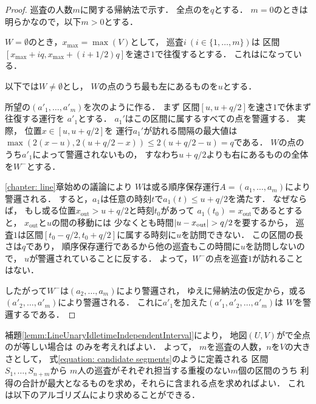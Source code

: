 \begin{proof}
  \newcommand{\leftmostpoint}{u}  %
  \newcommand{\leftmostpatroller}{巡査1}

  巡査の人数$m$に関する帰納法で示す．
  全点の{\maxIdletime}を$q$とする．
  $m = 0$のときは明らかなので，以下$m > 0$とする．

  $W = \emptyset$のとき，$x_{\max} = \max(V)$として，
  巡査$i\ (i \in \{ 1, \ldots, m \})$は
  区間$[x_{\max} + iq, x_{\max} + (i + 1/2)q]$を速さ$1$で往復するとする．
  これは{\sepSectPatroll}になっている．

  以下では$W \neq \emptyset$とし，
  $W$の点のうち最も左にあるものを$\leftmostpoint$とする．

  所望の{\sepSectPatroll}$(a' _1, \dots, a' _m)$を次のように作る．
  まず
  区間$[\leftmostpoint, \leftmostpoint + q/2]$を速さ$1$で休まず往復する運行を
  $a' _1$とする．
  $a_1'$はこの区間に属するすべての点を警邏する．
  実際，
  位置$x \in [u, u + q/2]$を
  運行$a_1'$が訪れる間隔の最大値は
  $ \max( 2(x - \leftmostpoint), 2(\leftmostpoint + q/2 - x) )
    \leq 2(\leftmostpoint + q/2 - \leftmostpoint) = q$である．
  $W$の点のうち$a' _1$によって警邏されないもの，
  すなわち$u + q / 2$よりも右にあるものの全体を$W^-$とする．

  \ref{chapter: line}章始めの議論により
  $W$は或る順序保存運行$A = (a_1, \ldots, a_m)$により警邏される．
  すると，$a_1$は任意の時刻$t$で$a_1(t) \leq u + q/2$を満たす．
  \newcommand{\vout}{x_{\mathrm{out}}}
  なぜならば，
  もし或る位置$\vout > u + q/2$と時刻$t_0$があって
  $a_1(t_0) = \vout$であるとすると，
  $\vout$と$u$の間の移動には
  少なくとも時間$\abs{u - \vout} > q / 2$を要するから，
  巡査$1$は区間$[t_0 - q / 2, t_0 + q / 2]$に属する時刻に$u$を訪問できない．
  この区間の長さは$q$であり，
  順序保存運行であるから他の巡査もこの時間に$u$を訪問しないので，
  $u$が警邏されていることに反する．
  よって，$W^-$の点を巡査$1$が訪れることはない．

  したがって$W^-$は$(a _2, \ldots, a _m)$により警邏され，
  ゆえに帰納法の仮定から，或る{\sepSectPatroll}$(a' _2, \ldots, a' _m)$により警邏される．
  これに$a' _1$を加えた$(a' _1, a' _2, \dots, a' _m)$は
  $W$を警邏する{\sepSectPatroll}である．
\end{proof}


補題\ref{lemm:LineUnaryIdletimeIndependentInterval}により，
地図$(U, V)$が{\graphLine}で全点の{\maxIdletime}が等しい場合は
{\sepSectPatroll}のみを考えればよい．
よって，
$m$を巡査の人数，$n$を$V$の大きさとして，
式\eqref{equation: candidate segments}のように定義される
区間$S_1, \ldots, S_{n + m}$から
$m$人の巡査がそれぞれ担当する重複のない$m$個の区間のうち
利得の合計が最大となるものを求め，それらに含まれる点を求めればよい．
これは以下のアルゴリズムにより求めることができる．

